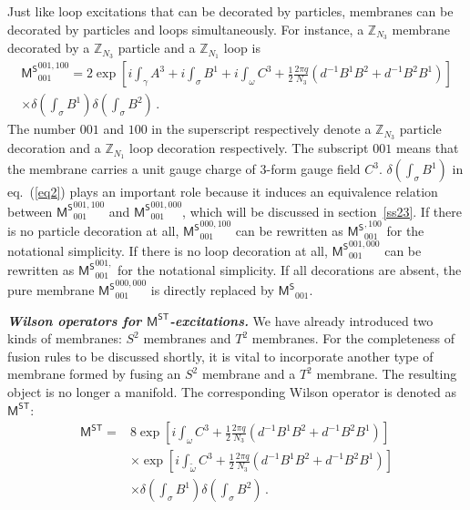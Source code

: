 \documentclass[11pt,nofootinbib,preprint]{revtex4-1}
\begin{document}
Just like loop excitations that can be decorated by particles, membranes can   be decorated by particles and loops simultaneously. For instance, a $\mathbb{Z} _{N_3}$ membrane decorated by a $\mathbb{Z} _{N_3}$ particle and a $\mathbb{Z} _{N_1}$ loop is
\begin{multline}
	\mathsf{M^S}_{001}^{001,100}=2\exp \left[ i\int_{\gamma}{A^3}+i\int_{\sigma}{B^1}+i\int_{\omega}{C^3+\frac{1}{2}\frac{2\pi q}{N_3}\left( d^{-1}B^1B^2+d^{-1}B^2B^1 \right)} \right]\\ \times\delta \left( \int_{\sigma}{B^1} \right) \delta \left( \int_{\sigma}{B^2} \right) \,.
	\label{eq2}
\end{multline}
The number  $001$ and $100$ in the superscript respectively denote a $\mathbb{Z} _{N_3}$ particle  decoration and a $\mathbb{Z} _{N_1}$ loop decoration respectively. The subscript $001$ means that the membrane carries a unit gauge charge of $3$-form gauge field $C^3$. $\delta \left( \int_{\sigma}{B^1} \right)$ in eq.~(\ref{eq2}) plays an important role because it induces an equivalence relation between $\mathsf{M^S}_{001}^{001,100}$ and $\mathsf{M^S}_{001}^{001,000}$, which will be  discussed in section~\ref{ss23}. If there is no particle decoration at all, $\mathsf{M^S}_{001}^{000,100}$ can be  rewritten as $\mathsf{M^S}_{001}^{,100}$ for the notational simplicity.  If there is no loop decoration at all, $\mathsf{M^S}_{001}^{001,000}$ can be  rewritten as $\mathsf{M^S}_{001}^{001,}$ for the notational simplicity. If all decorations are absent, the pure membrane $\mathsf{M^S}_{001}^{000,000}$ is directly replaced by $\mathsf{M^S}_{001}$.




\textbf{\textit{Wilson operators for $\mathsf{M^{ST}}$-excitations.}}
We have already introduced two kinds of membranes: $S^2$ membranes and $T^2$ membranes. For the completeness of fusion rules to be discussed shortly, it is vital to incorporate another type of membrane formed by fusing an $S^2$ membrane and a $T^2$ membrane. The resulting object is no longer a manifold.  The corresponding Wilson operator is denoted as $\mathsf{M^{ST}}$:
\begin{align}
	\mathsf{M^{ST}}=&8\exp \left[ i\int_{\omega}{C^3+\frac{1}{2}\frac{2\pi q}{N_3}\left( d^{-1}B^1B^2+d^{-1}B^2B^1 \right)} \right] \nonumber
	\\
	&\times \exp \left[ i\int_{\tilde{\omega}}{C^3+\frac{1}{2}\frac{2\pi q}{N_3}\left( d^{-1}B^1B^2+d^{-1}B^2B^1 \right)} \right] \nonumber
	\\
	&\times \delta \left( \int_{\sigma}{B^1} \right) \delta \left( \int_{\sigma}{B^2} \right)\,.
\end{align}
 
\end{document}
